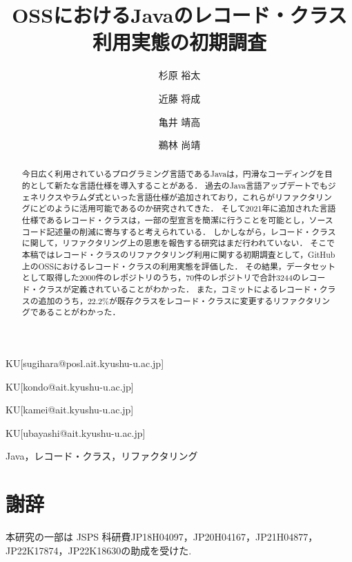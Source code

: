 \documentclass[submit,techrep,noauthor]{ipsj}
\begin{document}
\title{OSSにおけるJavaのレコード・クラス利用実態の初期調査}



\author{杉原 裕太}{}{KU}[sugihara@posl.ait.kyushu-u.ac.jp]
\author{近藤 将成}{}{KU}[kondo@ait.kyushu-u.ac.jp]
\author{亀井 靖高}{}{KU}[kamei@ait.kyushu-u.ac.jp]
\author{鵜林 尚靖}{}{KU}[ubayashi@ait.kyushu-u.ac.jp]

\begin{abstract}
  今日広く利用されているプログラミング言語であるJavaは，円滑なコーディングを目的として新たな言語仕様を導入することがある．
  過去のJava言語アップデートでもジェネリクスやラムダ式といった言語仕様が追加されており，これらがリファクタリングにどのように活用可能であるのか研究されてきた．
  そして2021年に追加された言語仕様であるレコード・クラスは，一部の型宣言を簡潔に行うことを可能とし，ソースコード記述量の削減に寄与すると考えられている．
  しかしながら，レコード・クラスに関して，リファクタリング上の恩恵を報告する研究はまだ行われていない．
  そこで本稿ではレコード・クラスのリファクタリング利用に関する初期調査として，GitHub上のOSSにおけるレコード・クラスの利用実態を評価した．
  その結果，データセットとして取得した2000件のレポジトリのうち，70件のレポジトリで合計3244のレコード・クラスが定義されていることがわかった．
  また，コミットによるレコード・クラスの追加のうち，22.2\%が既存クラスをレコード・クラスに変更するリファクタリングであることがわかった．
\end{abstract}

\begin{jkeyword}
  Java，レコード・クラス，リファクタリング
\end{jkeyword}

\maketitle

\setcounter{page}{1}

{\large






}

\section*{謝辞}
本研究の一部は JSPS 科研費JP18H04097，JP20H04167，JP21H04877，JP22K17874，JP22K18630の助成を受けた.


%


\end{document}
